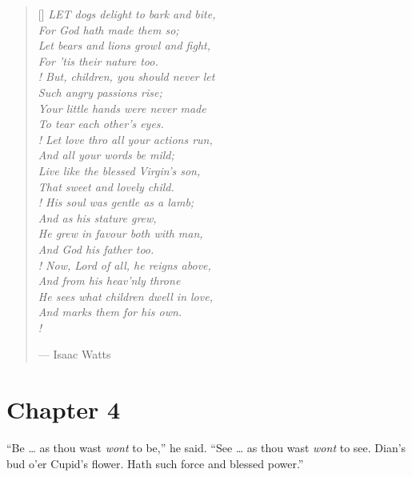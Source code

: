 \documentclass[10pt,makeidx]{extreport}
\begin{document}
\renewcommand{\poemtoc}{subsection}
\settowidth{\versewidth}{Live like the blessed Virgin's son,}
\begin{verse}[\versewidth]
	\textit{LET dogs delight to bark and bite,\\
		\hspace{2em} For God hath made them so; \\
		Let bears and lions growl and fight,\\
		\hspace{2em} For 'tis their nature too.\\!
		But, children, you should never let\\
		\hspace{2em} Such angry passions rise; \\
		Your little hands were never made\\
		\hspace{2em} To tear each other's eyes.\\!
		Let love thro all your actions run,\\
		\hspace{2em} And all your words be mild; \\
		Live like the blessed Virgin's son,\\
		\hspace{2em} That sweet and lovely child.\\!
		His soul was gentle as a lamb;\\
		\hspace{2em} And as his stature grew, \\
		He grew in favour both with man,\\
		\hspace{2em} And God his father too.\\!
		Now, Lord of all, he reigns above,\\
		\hspace{2em} And from his heav'nly throne \\
		He sees what children dwell in love,\\
		\hspace{2em} And marks them for his own.\\! }
		
		--- Isaac Watts\parencite{Watts1715}
\end{verse}

\section{Chapter 4}
\begin{tcolorbox}[pullquote,title={Rasmussen Cousin, \textit{A Midsummer Night's Dream}, Regnum-8},width=0.8\linewidth,center upper]
	\enquote{Be … as thou wast \textit{wont} to be,'' he said. ``See … as thou wast \textit{wont} to see. Dian’s bud o’er Cupid’s flower. Hath such force and blessed power.}
\end{tcolorbox}
\end{document}
